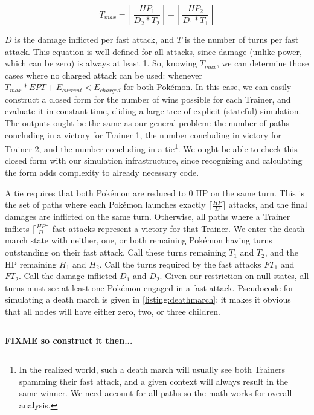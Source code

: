 \[ T_{max} = \left\lceil\frac{HP_1}{D_2 * T_2}\right\rceil + \left\lceil\frac{HP_2}{D_1 * T_1}\right\rceil \]

$D$ is the damage inflicted per fast attack, and $T$ is the number of turns per fast attack.
This equation is well-defined for all attacks, since damage (unlike power,
  which can be zero) is always at least 1.
So, knowing $T_{max}$, we can determine those cases where no charged attack
  can be used: whenever $T_{max} * EPT + E_{current} < E_{charged}$ for both Pokémon.
In this case, we can easily construct a closed form for the number of wins
  possible for each Trainer, and evaluate it in constant time, eliding
  a large tree of explicit (stateful) simulation.
The outputs ought be the same as our general problem: the number of paths
  concluding in a victory for Trainer 1, the number concluding in victory for
  Trainer 2, and the number concluding in a tie\footnote{In the realized world,
  such a death march will usually see both Trainers spamming their fast attack,
  and a given context will always result in the same winner. We need account
  for all paths so the math works for overall analysis.}.
We ought be able to check this closed form with our simulation infrastructure,
  since recognizing and calculating the form adds complexity to
  already necessary code.

A tie requires that both Pokémon are reduced to 0 HP on the same turn.
This is the set of paths where each Pokémon launches exactly $\lceil\frac{HP}{D}\rceil$
  attacks, and the final damages are inflicted on the same turn.
Otherwise, all paths where a Trainer inflicts $\lceil\frac{HP}{D}\rceil$ fast attacks
  represent a victory for that Trainer.
We enter the death march state with neither, one, or both remaining Pokémon having
  turns outstanding on their fast attack.
Call these turns remaining $T_1$ and $T_2$, and the HP remaining $H_1$ and $H_2$.
Call the turns required by the fast attacks $FT_1$ and $FT_2$.
Call the damage inflicted $D_1$ and $D_2$.
Given our restriction on null states, all turns must see at least one Pokémon engaged
  in a fast attack.
Pseudocode for simulating a death march is given in \autoref{listing:deathmarch}; it
  makes it obvious that all nodes will have either zero, two, or three children.
\begin{code}
\label{listing:deathmarch}
\inputminted{cpp}{s/endgame.pcode}
\end{code}

\textbf{FIXME so construct it then...}

